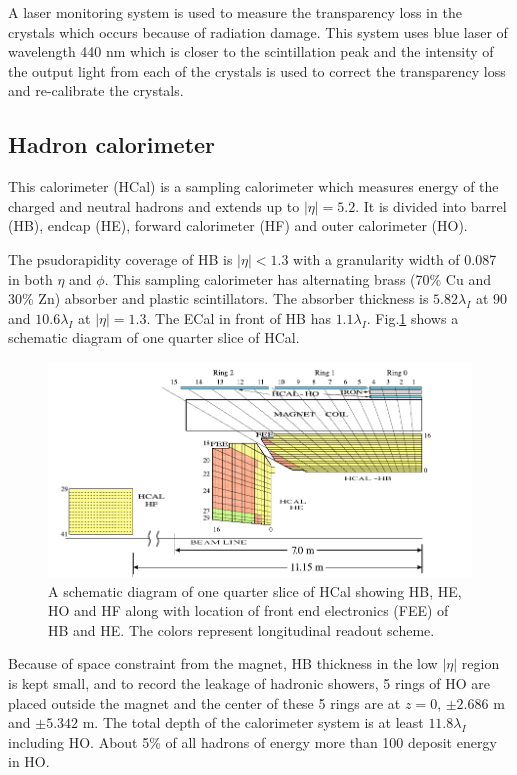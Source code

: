 A laser monitoring system is used to measure the transparency loss in the crystals which occurs because of radiation damage. This system 
uses blue laser of wavelength 440 nm which is closer to the scintillation peak and the intensity of the output light from each of the 
crystals is used to correct the transparency loss and re-calibrate the crystals.

\subsection{Hadron calorimeter}
This calorimeter (HCal) is a sampling calorimeter which measures energy of the charged and neutral hadrons and extends up to $|\eta| = 
5.2$. It is divided into barrel (HB), endcap (HE), forward calorimeter (HF) and outer calorimeter (HO). 

The psudorapidity coverage of HB is $|\eta| < 1.3$ with a granularity width of 0.087 in both $\eta$ and $\phi$. This sampling calorimeter 
has alternating brass (70\% Cu and 30\% Zn) absorber and plastic scintillators. The absorber thickness is $5.82\lambda_I$ at 90\textdegree 
and $10.6\lambda_I$ at $|\eta| =1.3$. The ECal in front of HB has $1.1\lambda_I$. Fig.\ref{fig:Hcal_schematic} shows a schematic diagram 
of one quarter slice of HCal.
\begin{figure}[h!]
\centering
\includegraphics[width=0.9\linewidth]{../Figures/Chap2/Hcal_schematic}
\caption[Schematic diagram of HCal]{A schematic diagram of one quarter slice of HCal showing HB, HE, HO and HF along with location of 
front end electronics (FEE) of HB and HE. The colors represent longitudinal readout scheme.}
\label{fig:Hcal_schematic}
\end{figure}
Because of space constraint from the magnet, HB thickness in the low $|\eta|$ region is kept small, and to record the leakage of hadronic 
showers, 5 rings of HO are placed outside the magnet and the center of these 5 rings are at $z=0$, $\pm2.686$ m and $\pm5.342$ m. The total depth of the calorimeter system is at least $11.8\lambda_I$ including HO.
About 5\% of all hadrons of energy more than 100 \gev deposit energy in HO.

